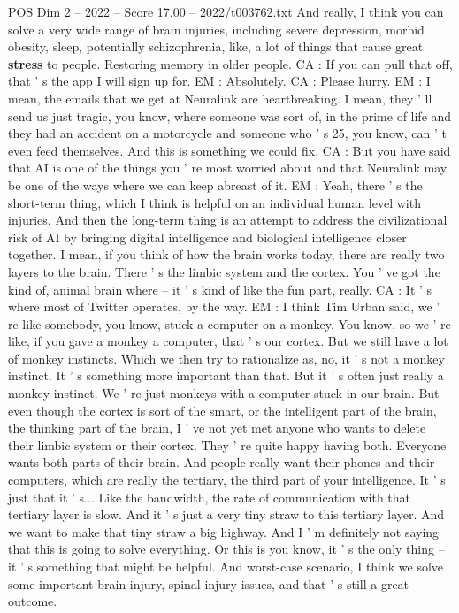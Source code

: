 \begin{textsample}{POS Dim 2 – 2022 – Score 17.00 – 2022/t003762.txt}
And really, I think you can solve a very wide range of brain injuries, including severe depression, morbid obesity, sleep, potentially schizophrenia, like, a lot of things that cause great \textbf{stress} to people.
Restoring memory in older people.
CA : If you can pull that off, that ' s the app I will sign up for.
EM : Absolutely.
CA : Please hurry.
EM : I mean, the emails that we get at Neuralink are heartbreaking.
I mean, they ' ll send us just tragic, you know, where someone was sort of, in the prime of life and they had an accident on a motorcycle and someone who ' s 25, you know, can ' t even feed themselves.
And this is something we could fix.
CA : But you have said that AI is one of the things you ' re most worried about and that Neuralink may be one of the ways where we can keep abreast of it.
EM : Yeah, there ' s the short-term thing, which I think is helpful on an individual human level with injuries.
And then the long-term thing is an attempt to address the civilizational risk of AI by bringing digital intelligence and biological intelligence closer together.
I mean, if you think of how the brain works today, there are really two layers to the brain.
There ' s the limbic system and the cortex.
You ' ve got the kind of, animal brain where -- it ' s kind of like the fun part, really.
CA : It ' s where most of Twitter operates, by the way.
EM : I think Tim Urban said, we ' re like somebody, you know, stuck a computer on a monkey.
You know, so we ' re like, if you gave a monkey a computer, that ' s our cortex.
But we still have a lot of monkey instincts.
Which we then try to rationalize as, no, it ' s not a monkey instinct.
It ' s something more important than that.
But it ' s often just really a monkey instinct.
We ' re just monkeys with a computer stuck in our brain.
But even though the cortex is sort of the smart, or the intelligent part of the brain, the thinking part of the brain, I ' ve not yet met anyone who wants to delete their limbic system or their cortex.
They ' re quite happy having both.
Everyone wants both parts of their brain.
And people really want their phones and their computers, which are really the tertiary, the third part of your intelligence.
It ' s just that it ' s...
Like the bandwidth, the rate of communication with that tertiary layer is slow.
And it ' s just a very tiny straw to this tertiary layer.
And we want to make that tiny straw a big highway.
And I ' m definitely not saying that this is going to solve everything.
Or this is you know, it ' s the only thing -- it ' s something that might be helpful.
And worst-case scenario, I think we solve some important brain injury, spinal injury issues, and that ' s still a great outcome.

\end{textsample}
